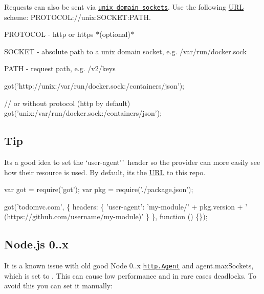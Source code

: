 Requests can also be sent via \href{http://serverfault.com/questions/124517/whats-the-difference-between-unix-socket-and-tcp-ip-socket}{\tt unix domain sockets}. Use the following \mbox{\hyperlink{namespace_u_r_l}{U\+RL}} scheme\+: {\ttfamily P\+R\+O\+T\+O\+C\+OL\+://unix\+:S\+O\+C\+K\+ET\+:P\+A\+TH}.


\begin{DoxyItemize}
\item {\ttfamily P\+R\+O\+T\+O\+C\+OL} -\/ {\ttfamily http} or {\ttfamily https} $\ast$(optional)$\ast$
\item {\ttfamily S\+O\+C\+K\+ET} -\/ absolute path to a unix domain socket, e.\+g. {\ttfamily /var/run/docker.sock}
\item {\ttfamily P\+A\+TH} -\/ request path, e.\+g. {\ttfamily /v2/keys}
\end{DoxyItemize}


\begin{DoxyCode}
got('http://unix:/var/run/docker.sock:/containers/json');

// or without protocol (http by default)
got('unix:/var/run/docker.sock:/containers/json');
\end{DoxyCode}


\subsection*{Tip}

It\textquotesingle{}s a good idea to set the `\textquotesingle{}user-\/agent'\`{} header so the provider can more easily see how their resource is used. By default, it\textquotesingle{}s the \mbox{\hyperlink{namespace_u_r_l}{U\+RL}} to this repo.


\begin{DoxyCode}
var got = require('got');
var pkg = require('./package.json');

got('todomvc.com', \{
    headers: \{
        'user-agent': 'my-module/' + pkg.version + ' (https://github.com/username/my-module)'
    \}
\}, function () \{\});
\end{DoxyCode}


\subsection*{Node.\+js 0..\+x}

It is a known issue with old good Node 0..\+x \href{https://nodejs.org/docs/v0.10.39/api/http.html#http_class_http_agent}{\tt {\ttfamily http.\+Agent}} and {\ttfamily agent.\+max\+Sockets}, which is set to {}. This can cause low performance and in rare cases deadlocks. To avoid this you can set it manually\+:


